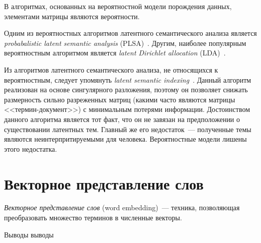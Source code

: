 В алгоритмах, основанных на вероятностной модели порождения
данных, элементами матрицы являются вероятности.

Одним из вероятностных алгоритмов латентного семантического анализа
является \textit{probabalistic latent semantic analysis}
(PLSA)~\cite{chemudugunta2007modeling}. Другим, наиболее
популярным вероятностным алгоритмом является \textit{latent
Dirichlet allocation} (LDA)~\cite{blei2003latent}.

Из алгоритмов латентного семантического анализа, не относящихся
к вероятностным, следует упомянуть 
\textit{latent semantic indexing}~\cite{deerwester1990indexing}.
Данный алгоритм реализован на основе сингулярного разложения,
поэтому он позволяет снижать размерность сильно разреженных
матриц (какими часто являются матрицы <<термин-документ>>) с
минимальным потерями информации. Достоинством данного алгоритма
является тот факт, что он не завязан на предположении о
существовании латентных тем. Главный же его недостаток~--- 
полученные темы являются неинтерпритируемыми для человека.
Вероятностные модели лишены этого недостатка.

\section{Векторное представление слов}
\label{sec:word_embedding}
\textit{Векторное представление слов} (word embedding)~---
техника, позволяющая преобразовать множество терминов в
численные векторы.

\chapterconclusion

Выводы выводы
